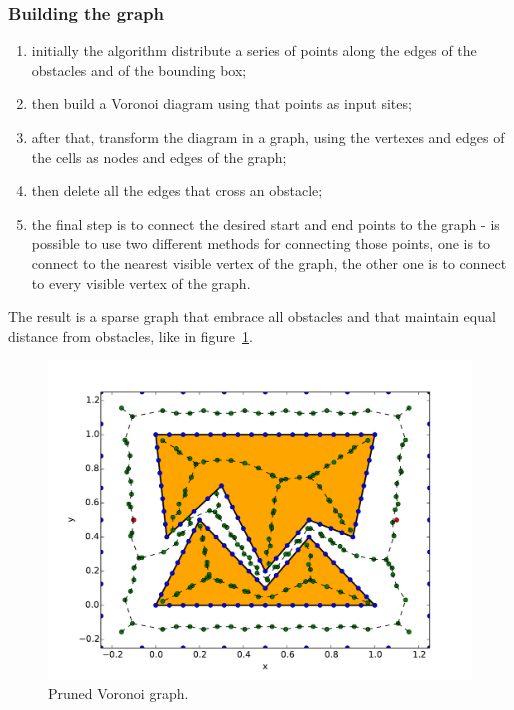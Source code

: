 \documentclass[a4paper]{article}
\begin{document}
\subsubsection{Building the graph}
\begin{enumerate}
\item\label{item:distDots} initially the algorithm distribute a series of points along the
  edges of the obstacles and of the bounding box;
\item\label{item:voronoi} then build a Voronoi
  diagram using that points as input sites;
\item\label{item:graph} after that, transform the diagram in a graph, using the
  vertexes and edges of the cells as nodes and edges of the graph;
\item\label{item:pruning} then
  delete all the edges that cross an obstacle;
\item\label{item:startEnd} the final step is to connect the desired start and end points to the
  graph - is possible to use two different methods for connecting
  those points, one is to connect to the nearest visible vertex of the
  graph, the other one is to connect to every visible vertex of the
  graph.
\end{enumerate}

The result is a sparse
graph that embrace all obstacles and that maintain equal distance from
obstacles, like in figure~\ref{fig:voronoi}.
\begin{figure}[htb]
  \centering
  \includegraphics[width=\textwidth]{img/voronoi.pdf}
  \caption{Pruned Voronoi graph.}
  \label{fig:voronoi}
\end{figure}
\end{document}
